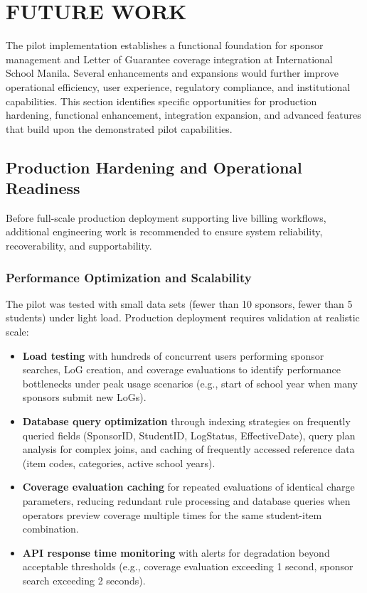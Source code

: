 
\section{FUTURE WORK}

The pilot implementation establishes a functional foundation for sponsor management and Letter of Guarantee coverage integration at International School Manila. Several enhancements and expansions would further improve operational efficiency, user experience, regulatory compliance, and institutional capabilities. This section identifies specific opportunities for production hardening, functional enhancement, integration expansion, and advanced features that build upon the demonstrated pilot capabilities.

\subsection{Production Hardening and Operational Readiness}

Before full-scale production deployment supporting live billing workflows, additional engineering work is recommended to ensure system reliability, recoverability, and supportability.

\subsubsection{Performance Optimization and Scalability}

The pilot was tested with small data sets (fewer than 10 sponsors, fewer than 5 students) under light load. Production deployment requires validation at realistic scale:

\begin{itemize}
    \item \textbf{Load testing} with hundreds of concurrent users performing sponsor searches, LoG creation, and coverage evaluations to identify performance bottlenecks under peak usage scenarios (e.g., start of school year when many sponsors submit new LoGs).
    \item \textbf{Database query optimization} through indexing strategies on frequently queried fields (SponsorID, StudentID, LogStatus, EffectiveDate), query plan analysis for complex joins, and caching of frequently accessed reference data (item codes, categories, active school years).
    \item \textbf{Coverage evaluation caching} for repeated evaluations of identical charge parameters, reducing redundant rule processing and database queries when operators preview coverage multiple times for the same student-item combination.
    \item \textbf{API response time monitoring} with alerts for degradation beyond acceptable thresholds (e.g., coverage evaluation exceeding 1 second, sponsor search exceeding 2 seconds).
\end{itemize}

